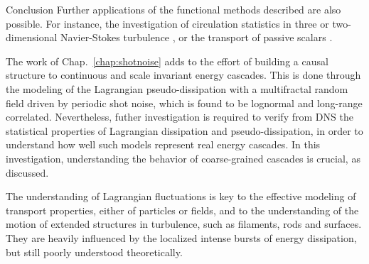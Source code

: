 \begin{chapter}{Conclusion}
Further applications of the functional methods described are also possible. For instance, the investigation of circulation statistics in three or two-dimensional Navier-Stokes turbulence \parencite{moriconi2004, smith1997, falkovich2011}, or the transport of passive scalars \parencite{balkovsky1998instanton}.


The work of Chap.~\ref{chap:shotnoise} adds to the effort of building a causal structure to continuous and scale invariant energy cascades. This is done through the modeling of the Lagrangian pseudo-dissipation with a multifractal random field driven by periodic shot noise, which is found to be lognormal and long-range correlated. Nevertheless, futher investigation is required to verify from DNS the statistical properties of Lagrangian dissipation and pseudo-dissipation, in order to understand how well such models represent real energy cascades. In this investigation, understanding the behavior of coarse-grained cascades is crucial, as discussed. 


The understanding of Lagrangian fluctuations is key to the effective modeling of transport properties, either of particles or fields, and to the understanding of the motion of extended structures in turbulence, such as filaments, rods and surfaces. They are heavily influenced by the localized intense bursts of energy dissipation, but still poorly understood theoretically.


\end{chapter}